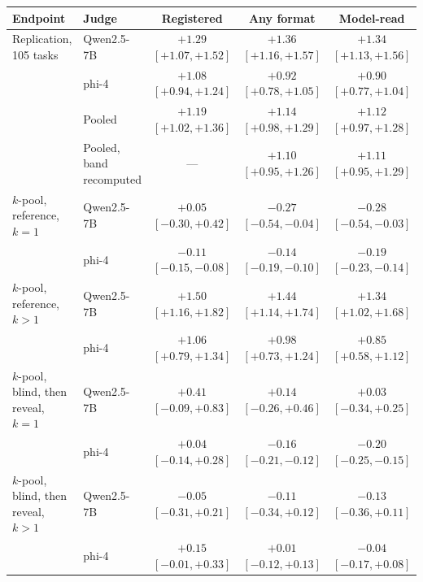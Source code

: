 \begin{tabular}{llccc}
\toprule
Endpoint & Judge & Registered & Any format & Model-read \\
\midrule
Replication, 105 tasks & Qwen2.5-7B & $+1.29$ {\scriptsize$[+1.07,+1.52]$} & $+1.36$ {\scriptsize$[+1.16,+1.57]$} & $+1.34$ {\scriptsize$[+1.13,+1.56]$} \\
 & phi-4 & $+1.08$ {\scriptsize$[+0.94,+1.24]$} & $+0.92$ {\scriptsize$[+0.78,+1.05]$} & $+0.90$ {\scriptsize$[+0.77,+1.04]$} \\
 & Pooled & $+1.19$ {\scriptsize$[+1.02,+1.36]$} & $+1.14$ {\scriptsize$[+0.98,+1.29]$} & $+1.12$ {\scriptsize$[+0.97,+1.28]$} \\
 & Pooled, band recomputed & --- & $+1.10$ {\scriptsize$[+0.95,+1.26]$} & $+1.11$ {\scriptsize$[+0.95,+1.29]$} \\
\addlinespace
$k$-pool, reference, $k{=}1$ & Qwen2.5-7B & $+0.05$ {\scriptsize$[-0.30,+0.42]$} & $-0.27$ {\scriptsize$[-0.54,-0.04]$} & $-0.28$ {\scriptsize$[-0.54,-0.03]$} \\
 & phi-4 & $-0.11$ {\scriptsize$[-0.15,-0.08]$} & $-0.14$ {\scriptsize$[-0.19,-0.10]$} & $-0.19$ {\scriptsize$[-0.23,-0.14]$} \\
$k$-pool, reference, $k{>}1$ & Qwen2.5-7B & $+1.50$ {\scriptsize$[+1.16,+1.82]$} & $+1.44$ {\scriptsize$[+1.14,+1.74]$} & $+1.34$ {\scriptsize$[+1.02,+1.68]$} \\
 & phi-4 & $+1.06$ {\scriptsize$[+0.79,+1.34]$} & $+0.98$ {\scriptsize$[+0.73,+1.24]$} & $+0.85$ {\scriptsize$[+0.58,+1.12]$} \\
$k$-pool, blind, then reveal, $k{=}1$ & Qwen2.5-7B & $+0.41$ {\scriptsize$[-0.09,+0.83]$} & $+0.14$ {\scriptsize$[-0.26,+0.46]$} & $+0.03$ {\scriptsize$[-0.34,+0.25]$} \\
 & phi-4 & $+0.04$ {\scriptsize$[-0.14,+0.28]$} & $-0.16$ {\scriptsize$[-0.21,-0.12]$} & $-0.20$ {\scriptsize$[-0.25,-0.15]$} \\
$k$-pool, blind, then reveal, $k{>}1$ & Qwen2.5-7B & $-0.05$ {\scriptsize$[-0.31,+0.21]$} & $-0.11$ {\scriptsize$[-0.34,+0.12]$} & $-0.13$ {\scriptsize$[-0.36,+0.11]$} \\
 & phi-4 & $+0.15$ {\scriptsize$[-0.01,+0.33]$} & $+0.01$ {\scriptsize$[-0.12,+0.13]$} & $-0.04$ {\scriptsize$[-0.17,+0.08]$} \\
\bottomrule
\end{tabular}
